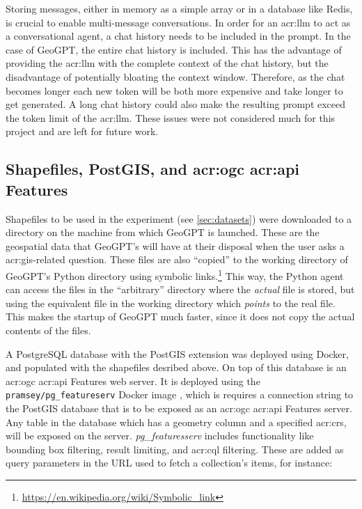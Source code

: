 Storing messages, either in memory as a simple array or in a database like Redis, is crucial to enable multi-message conversations. In order for an \gls{acr:llm} to act as a conversational agent, a chat history needs to be included in the prompt. In the case of GeoGPT, the entire chat history is included. This has the advantage of providing the \gls{acr:llm} with the complete context of the chat history, but the disadvantage of potentially bloating the context window. Therefore, as the chat becomes longer each new token will be both more expensive and take longer to get generated. A long chat history could also make the resulting prompt exceed the token limit of the \gls{acr:llm}. These issues were not considered much for this project and are left for future work.

\subsection[Shapefiles, PostGIS, and OGC API Features]{Shapefiles, PostGIS, and \acrshort{acr:ogc} \acrshort{acr:api} Features}
\label{subsec:postgis-and-oaf-architecture}

Shapefiles to be used in the experiment (see \autoref{sec:datasets}) were downloaded to a directory on the machine from which GeoGPT is launched. These are the geospatial data that GeoGPT's will have at their disposal when the user asks a \acrshort{acr:gis}-related question. These files are also \enquote{copied} to the working directory of GeoGPT's Python directory using symbolic links.\footnote{\url{https://en.wikipedia.org/wiki/Symbolic_link}} This way, the Python agent can access the files in the \enquote{arbitrary} directory where the \textit{actual} file is stored, but using the equivalent file in the working directory which \textit{points} to the real file. This makes the startup of GeoGPT much faster, since it does not copy the actual contents of the files.

A PostgreSQL database with the PostGIS extension was deployed using Docker, and populated with the shapefiles desribed above. On top of this database is an \acrshort{acr:ogc} \acrshort{acr:api} Features web server. It is deployed using the \texttt{pramsey/pg\_featureserv} Docker image \citep{crunchydataCrunchyDataPg_featureserv2024}, which is requires a connection string to the PostGIS database that is to be exposed as an \acrshort{acr:ogc} \acrshort{acr:api} Features server. Any table in the database which has a geometry column and a specified \gls{acr:crs}, will be exposed on the server. \textit{pg\_featuresserv} includes functionality like bounding box filtering, result limiting, and \acrshort{acr:cql} filtering. These are added as query parameters in the URL used to fetch a collection's items, for instance:

